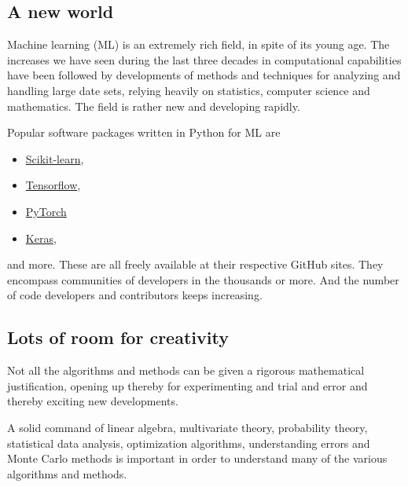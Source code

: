 \documentclass[%
oneside,                 %
final,                   %
10pt]{article}
\newenvironment{block_mdfboxadmon}[1][]{
\begin{block_mdfboxmdframed}[frametitle=#1]
}
{
\end{block_mdfboxmdframed}
}
\begin{document}
\subsection{A new world}

\begin{block_mdfboxadmon}[]
Machine learning (ML) is an extremely rich field, in spite of its young age. The
increases we have seen during the last three decades in computational
capabilities have been followed by developments of methods and
techniques for analyzing and handling large date sets, relying heavily
on statistics, computer science and mathematics.  The field is rather
new and developing rapidly. 

Popular software packages written in Python for ML are

\begin{itemize}
\item \href{{http://scikit-learn.org/stable/}}{Scikit-learn}, 

\item \href{{https://www.tensorflow.org/}}{Tensorflow},

\item \href{{http://pytorch.org/}}{PyTorch}

\item \href{{https://keras.io/}}{Keras},
\end{itemize}

\noindent
and more. These are all freely available at their respective GitHub sites. They 
encompass communities of developers in the thousands or more. And the number
of code developers and contributors keeps increasing.
\end{block_mdfboxadmon} %



\subsection{Lots of room for creativity}

\begin{block_mdfboxadmon}[]
Not all the
algorithms and methods can be given a rigorous mathematical
justification, opening up thereby for experimenting
and trial and error and thereby exciting new developments.
\end{block_mdfboxadmon} %




\begin{block_mdfboxadmon}[]
A solid command of linear algebra, multivariate theory, 
probability theory, statistical data analysis, optimization algorithms, 
understanding errors and Monte Carlo methods is important in order to understand many of the 
various algorithms and methods.
\end{block_mdfboxadmon} %
\end{document}
